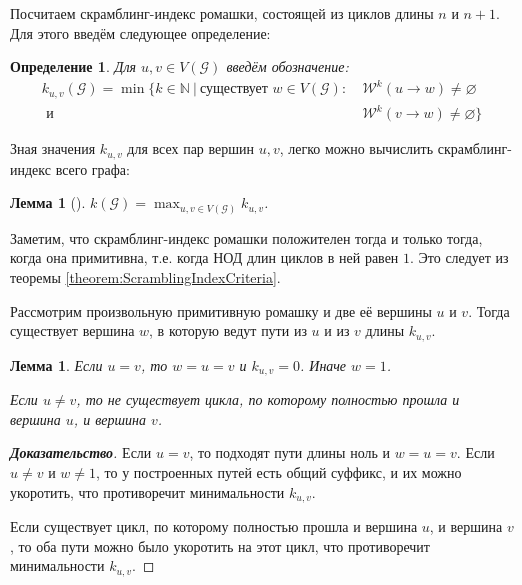 \documentclass[12pt]{article}
\newtheorem{definition}[theorem]{Определение}
\newtheorem{lemma}[theorem]{Лемма}
\begin{document}
Посчитаем скрамблинг-индекс ромашки, состоящей из циклов длины $n$ и $n + 1$. Для этого введём следующее определение:

\begin{definition}
Для $u, v \in V(\mathcal{G})$ введём обозначение:\begin{align*}
k_{u,v}(\mathcal{G}) = \min \{ k \in \mathbb{N} \ | \ \text{существует } w \in V(\mathcal{G}) :\  &\mathcal{W}^k(u \rightarrow w) \neq \varnothing \\
\text{ и } &\mathcal{W}^k(v \rightarrow w) \neq \varnothing\}
\end{align*}
\end{definition}

Зная значения $k_{u,v}$ для всех пар вершин $u, v$, легко можно вычислить скрамблинг-индекс всего графа:

\begin{lemma}[\cite{scramblingIndex}]
\label{k_uvLemma}
$k(\mathcal{G}) = \max_{u, v \in V(\mathcal{G})} k_{u,v}$.
\end{lemma}

Заметим, что скрамблинг-индекс ромашки положителен тогда и только тогда, когда она примитивна, т.е. когда НОД длин циклов в ней равен $1$. Это следует из теоремы \ref{theorem:ScramblingIndexCriteria}.

Рассмотрим произвольную примитивную ромашку и две её вершины $u$ и $v$. Тогда существует вершина $w$, в которую ведут пути из $u$ и из $v$ длины $k_{u,v}$.

\begin{lemma} \label{pathsToW}
Если $u = v$, то $w = u = v$ и $k_{u, v} = 0$. Иначе $w = 1$.

Если $u \ne v$, то не существует цикла, по которому полностью прошла и вершина $u$, и вершина $v$.
\end{lemma}
\begin{proof}[\textbf{Доказательство}]
Если $u = v$, то подходят пути длины ноль и $w = u = v$. Если $u \neq v$ и $w \neq 1$, то у построенных путей есть общий суффикс, и их можно укоротить, что противоречит минимальности $k_{u,v}$.

Если существует цикл, по которому полностью прошла и вершина $u$, и вершина $v$, то оба пути можно было укоротить на этот цикл, что противоречит минимальности $k_{u, v}$.
\end{proof}
\end{document}
